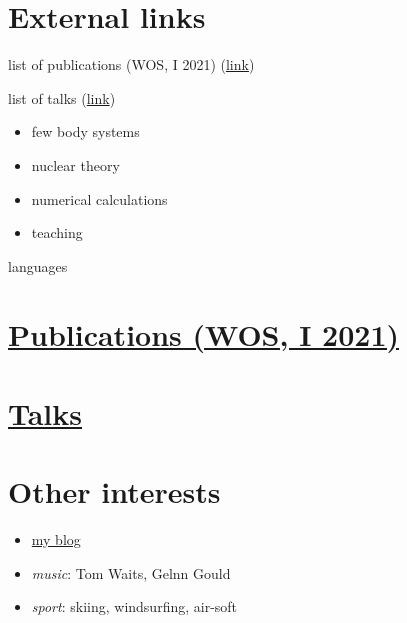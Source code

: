 \documentclass{article}
\providecommand{\tightlist}{%
  \setlength{\itemsep}{0pt}\setlength{\parskip}{0pt}}
\begin{document}
\section{External links}

\tightlist
\item list of publications (WOS, I 2021) (\href{https://kacpertopol.github.io/cv/0pl.html}{link})
\item list of talks (\href{https://kacpertopol.github.io/cv/00pl.html}{link})

  \begin{itemize}
  \tightlist
  \item
    few body systems
  \item
    nuclear theory
  \item
    numerical calculations
  \item
    teaching
  \end{itemize}
\item
  languages

\hypertarget{publications-wos-i-2021}{%
\section*{\texorpdfstring{\href{./0pl.html}{Publications (WOS, I
2021)}}{Publications (WOS, I 2021)}}\label{publications-wos-i-2021}}

\hypertarget{talks}{%
\section*{\texorpdfstring{\href{./00pl.html}{Talks}}{Talks}}\label{talks}}

\hypertarget{other-interests}{%
\section*{Other interests}\label{other-interests}}

\begin{itemize}
\tightlist
\item
  \href{https://kacpertopol.github.io/myblog/}{my blog}
\item
  \emph{music}: Tom Waits, Gelnn Gould
\item
  \emph{sport}: skiing, windsurfing, air-soft
\end{itemize}
\end{document}

